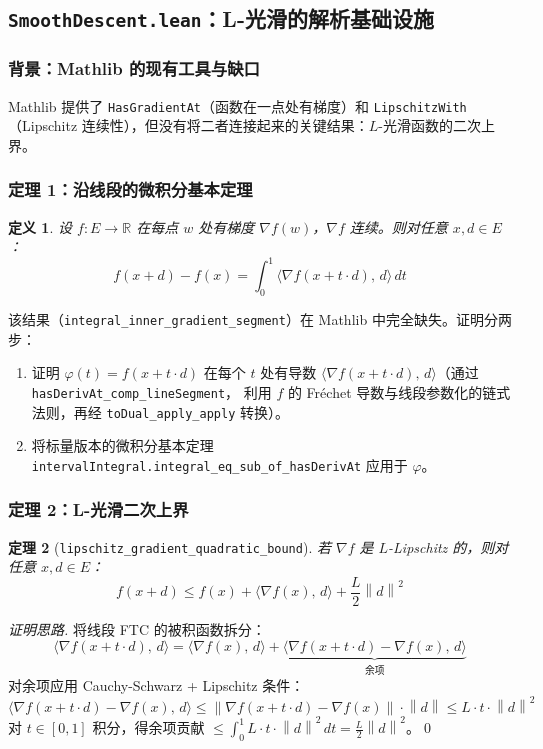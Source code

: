 \documentclass[12pt, a4paper]{article}
\newtheorem{theorem}{定理}[section]
\newtheorem{definition}[theorem]{定义}
\newcommand{\R}{\mathbb{R}}
\newcommand{\ip}[2]{\langle #1,\, #2 \rangle}
\newcommand{\norm}[1]{\left\| #1 \right\|}
\newcommand{\lean}[1]{\texttt{#1}}
\newcommand{\file}[1]{\textbf{\texttt{#1}}}
\begin{document}
\subsection{\file{SmoothDescent.lean}：L-光滑的解析基础设施}

\subsubsection{背景：Mathlib 的现有工具与缺口}

Mathlib 提供了 \lean{HasGradientAt}（函数在一点处有梯度）和 \lean{LipschitzWith}（Lipschitz
连续性），但没有将二者连接起来的关键结果：$L$-光滑函数的二次上界。

\subsubsection{定理 1：沿线段的微积分基本定理}

\begin{definition}
设 $f : E \to \R$ 在每点 $w$ 处有梯度 $\nabla f(w)$，$\nabla f$ 连续。则对任意 $x, d \in E$：
\[
  f(x + d) - f(x) = \int_0^1 \ip{\nabla f(x + t \cdot d)}{d}\, dt
\]
\end{definition}

该结果（\lean{integral\_inner\_gradient\_segment}）在 Mathlib 中完全缺失。证明分两步：
\begin{enumerate}
  \item 证明 $\varphi(t) = f(x + t \cdot d)$ 在每个 $t$ 处有导数
        $\ip{\nabla f(x + t\cdot d)}{d}$（通过 \lean{hasDerivAt\_comp\_lineSegment}，
        利用 $f$ 的 Fréchet 导数与线段参数化的链式法则，再经 \lean{toDual\_apply\_apply} 转换）。
  \item 将标量版本的微积分基本定理 \lean{intervalIntegral.integral\_eq\_sub\_of\_hasDerivAt}
        应用于 $\varphi$。
\end{enumerate}

\subsubsection{定理 2：L-光滑二次上界}

\begin{theorem}[\lean{lipschitz\_gradient\_quadratic\_bound}]
若 $\nabla f$ 是 $L$-Lipschitz 的，则对任意 $x, d \in E$：
\[
  f(x + d) \leq f(x) + \ip{\nabla f(x)}{d} + \frac{L}{2} \norm{d}^2
\]
\end{theorem}

\begin{proof}[证明思路]
将线段 FTC 的被积函数拆分：
\[
  \ip{\nabla f(x + t\cdot d)}{d} = \ip{\nabla f(x)}{d} + \underbrace{\ip{\nabla f(x+t\cdot d) - \nabla f(x)}{d}}_{\text{余项}}
\]
对余项应用 Cauchy-Schwarz + Lipschitz 条件：
\[
  \ip{\nabla f(x+t\cdot d) - \nabla f(x)}{d} \leq \norm{\nabla f(x+t\cdot d) - \nabla f(x)} \cdot \norm{d}
  \leq L \cdot t \cdot \norm{d}^2
\]
对 $t \in [0,1]$ 积分，得余项贡献 $\leq \int_0^1 L \cdot t \cdot \norm{d}^2\, dt = \frac{L}{2}\norm{d}^2$。\qed
\end{proof}
\end{document}
